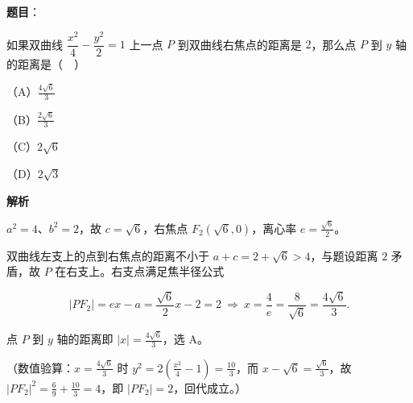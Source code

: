 \begin{answer}

\textbf{题目}：

如果双曲线 $\dfrac{x^2}{4}-\dfrac{y^2}{2}=1$ 上一点 $P$ 到双曲线右焦点的距离是 $2$，那么点 $P$ 到 $y$ 轴的距离是（　）

（A）$\frac{4\sqrt6}{3}$

（B）$\frac{2\sqrt6}{3}$

（C）$2\sqrt6$

（D）$2\sqrt3$

\textbf{解析}

$a^{2}=4$、$b^{2}=2$，故 $c=\sqrt6$，右焦点 $F_2(\sqrt6,0)$，离心率 $e=\frac{\sqrt6}{2}$。

双曲线左支上的点到右焦点的距离不小于 $a+c=2+\sqrt6>4$，与题设距离 $2$ 矛盾，故 $P$ 在右支上。右支点满足焦半径公式

\nopagebreak[4]
\[|PF_2|=ex-a=\frac{\sqrt6}{2}x-2=2\ \Longrightarrow\ x=\frac{4}{e}=\frac{8}{\sqrt6}=\frac{4\sqrt6}{3}.\]

点 $P$ 到 $y$ 轴的距离即 $|x|=\frac{4\sqrt6}{3}$，选 A。

（数值验算：$x=\frac{4\sqrt6}{3}$ 时 $y^{2}=2\left(\frac{x^{2}}{4}-1\right)=\frac{10}{3}$，而 $x-\sqrt6=\frac{\sqrt6}{3}$，故 $|PF_2|^{2}=\frac{6}{9}+\frac{10}{3}=4$，即 $|PF_2|=2$，回代成立。）


\end{answer}
